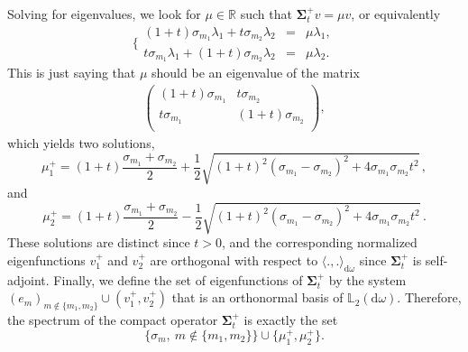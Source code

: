 \documentclass[twoside,11pt]{book}
\numberwithin{theorem}{chapter}
\numberwithin{definition}{chapter}
\numberwithin{proposition}{chapter}
\numberwithin{corollary}{chapter}
\numberwithin{example}{chapter}
\numberwithin{lemma}{chapter}
\numberwithin{assumption}{chapter}
\numberwithin{equation}{chapter}
\numberwithin{figure}{chapter}
\def\Ltwo{\mathbb{L}_{2}(\mathrm{d} \omega)}
\begin{document}
Solving for eigenvalues, we look for $\mu \in \mathbb{R}$ such that $\bm{\Sigma}_{t}^{+} v = \mu v$, or equivalently
$$
\bigg\{\begin{array}{ccc}
  (1+t) \sigma_{m_{1}} \lambda_{1} + t \sigma_{m_{2}} \lambda_{2} &=& \mu \lambda_{1}, \\
t \sigma_{m_{1}} \lambda_{1} +  (1+t) \sigma_{m_{2}} \lambda_{2} &=& \mu \lambda_{2}.
\end{array}
$$
This is just saying that $\mu$ should be an eigenvalue of the matrix
\begin{align}\label{CVS_eq:positive_matrix}
\left(\begin{array}{cc}
(1+t) \sigma_{m_{1}} & t \sigma_{m_{2}}\\
t \sigma_{m_{1}} & (1+t) \sigma_{m_{2}}\\
\end{array}\right),
\end{align}
which yields two solutions,
\begin{equation}
{\mu}_{1}^{+} = (1+t)\frac{\sigma_{m_{1}}+ \sigma_{m_{2}}}{2} + \frac{1}{2} \sqrt{(1+t)^{2}(\sigma_{m_{1}}-\sigma_{m_{2}})^{2}+4 \sigma_{m_{1}}\sigma_{m_{2}}t^{2}}\,,
\end{equation}
and
\begin{equation}
{\mu}_{2}^{+} = (1+t)\frac{\sigma_{m_{1}}+ \sigma_{m_{2}}}{2} - \frac{1}{2} \sqrt{(1+t)^{2}(\sigma_{m_{1}}-\sigma_{m_{2}})^{2}+4 \sigma_{m_{1}}\sigma_{m_{2}}t^{2}}\,.
\end{equation}
These solutions are distinct since $t>0$, and the corresponding normalized eigenfunctions $v_{1}^{+}$ and $v_{2}^{+}$ are orthogonal with respect to $\langle.,.\rangle_{\mathrm{d}\omega}$ since $\bm{\Sigma}_t^+$ is self-adjoint. Finally, we define the set of eigenfunctions of $\bm{\Sigma}_{t}^{+}$ by 
the system $(e_{m})_{m \notin \{m_{1},m_{2}\}} \cup (v_{1}^{+},v_{2}^{+})$ that is an orthonormal basis of $\Ltwo$. Therefore, the spectrum of the compact operator $\bm{\Sigma}_{t}^{+}$ is exactly the set
\begin{equation}
\{ \sigma_{m}, \: m \notin  \{m_{1},m_{2}\}\} \cup \{\mu_{1}^{+}, \mu_{2}^{+} \}.
\end{equation}
\end{document}
